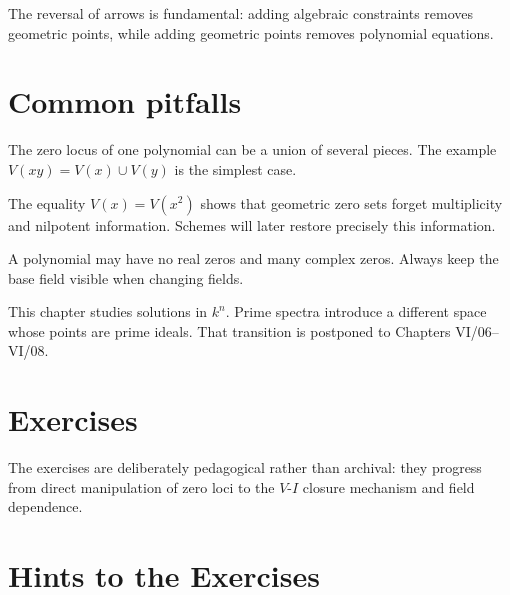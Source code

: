 The reversal of arrows is fundamental: adding algebraic constraints removes geometric
points, while adding geometric points removes polynomial equations.

\section{Common pitfalls}
\label{sec:vi01-pitfalls}

\begin{warning}
The zero locus of one polynomial can be a union of several pieces.  The example
\(V(xy)=V(x)\cup V(y)\) is the simplest case.
\end{warning}

\begin{warning}
The equality \(V(x)=V(x^2)\) shows that geometric zero sets forget multiplicity and
nilpotent information.  Schemes will later restore precisely this information.
\end{warning}

\begin{warning}
A polynomial may have no real zeros and many complex zeros.  Always keep the base field
visible when changing fields.
\end{warning}

\begin{warning}
This chapter studies solutions in \(k^n\).  Prime spectra introduce a different space whose
points are prime ideals.  That transition is postponed to Chapters VI/06--VI/08.
\end{warning}



\section{Exercises}
\label{sec:vi01-exercises}
The exercises are deliberately pedagogical rather than archival: they progress from direct
manipulation of zero loci to the \(V\)-\(I\) closure mechanism and field dependence.


\ifdefined\IncludeExerciseHints
\section{Hints to the Exercises}
\label{sec:vi01-exercise-hints}

\fi

